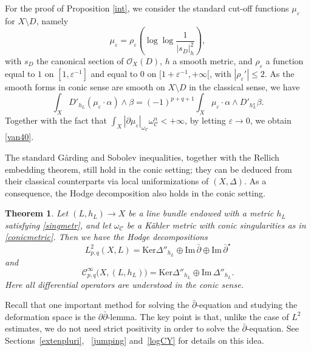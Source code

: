 \documentclass[english]{amsart}
\newcommand{\ddbar}{\partial\bar{\partial}}
\newcommand{\cC}{\mathcal{C}}
\renewcommand{\O}{\mathcal{O}}
\newcommand{\ep}{\varepsilon}
\renewcommand{\le}{\leqslant}
\newcommand{\Imm}{\mathrm{Im} \,}
\newcommand{\Ker}{\mathrm{Ker}}
\newcommand{\dbar}{\bar \partial}
\newtheorem{thm}{Theorem}[section]
\numberwithin{equation}{thm}
\begin{document}
For the proof of Proposition \ref{int}, we consider  the standard cut-off functions $\mu_\ep$ for $X\setminus D$, namely
\begin{equation}\label{cutoff}
\mu_\ep = \rho_\ep\!\left(\log\log\frac{1}{|s_D|_h^2}\right),
\end{equation}
with $s_D$ the canonical section of $\O_X(D)$, $h$ a smooth metric, and $\rho_\ep$ a function equal to $1$ on $[1,\ep^{-1}]$ and equal to $0$ on $[1+\ep^{-1},+\infty[$, with $|\rho_\ep'|\le 2$.  As the smooth forms in conic sense are smooth on $X\setminus D$ in the classical sense, we have 
$$	\int_X D'_{h_L} (\mu_\ep \cdot \alpha)\wedge \beta
= (-1)^{p+q+1}\int_X \mu_\ep \cdot \alpha\wedge D'_{h_L^\star}\beta .$$
Together with the fact that $\int_X |\partial \mu_\ep|_{\omega_\cC} \omega_\cC ^n < +\infty$, by letting $\ep \to 0$, we obtain \eqref{van40}.

\medskip

The standard G{\aa}rding and Sobolev inequalities, together with the Rellich embedding theorem, still hold in the conic setting; they can be deduced from their classical counterparts via local uniformizations of $(X,\Delta)$.
As a consequence, the Hodge decomposition also holds in the conic setting.

\begin{thm}\label{CoHo1}\cite[Thm 2.28]{JCMP}
	Let $(L,h_L)\to X$ be a line bundle endowed with a metric $h_L$ satisfying \eqref{singmetr}, and let $\omega_{\cC}$ be a K\"ahler metric with conic singularities as in \eqref{conicmetric}.
	Then we have the Hodge decompositions
	\begin{equation}\label{pave29111}
		L^2_{p,q}(X,L)=\Ker \Delta''_{h_L}\oplus \Imm \dbar \oplus \Imm \dbar^\star
	\end{equation}
	and
	\begin{equation}\label{pave291}
		\cC^\infty_{p,q}\bigl(X,(L,h_L)\bigr)
		= \Ker \Delta''_{h_L}\oplus \Imm \Delta''_{h_L}.
	\end{equation}
	Here all differential operators are understood in the conic sense.
\end{thm}

\medskip

Recall that one important method for solving the $\dbar$-equation and studying the deformation space is the $\ddbar$-lemma. The key point is that, unlike the case of $L^2$ estimates, we do not need strict positivity in order to solve the $\dbar$-equation. See Sections~\ref{extenpluri}, ~\ref{jumping}  and~\ref{logCY}  for details on this idea. 
\smallskip
 
\end{document}
